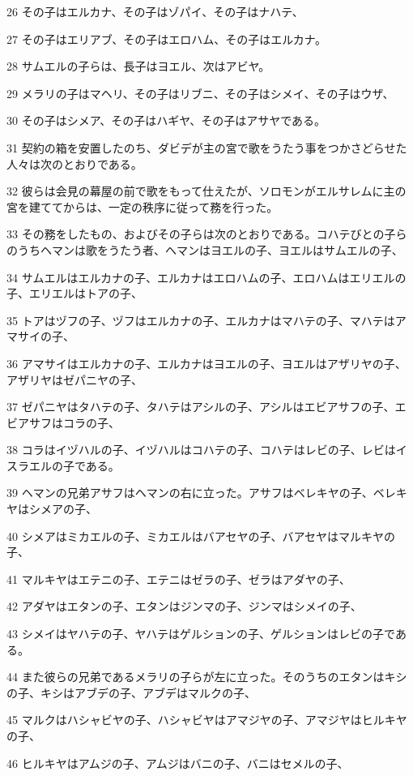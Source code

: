 \par 26 その子はエルカナ、その子はゾパイ、その子はナハテ、
\par 27 その子はエリアブ、その子はエロハム、その子はエルカナ。
\par 28 サムエルの子らは、長子はヨエル、次はアビヤ。
\par 29 メラリの子はマヘリ、その子はリブニ、その子はシメイ、その子はウザ、
\par 30 その子はシメア、その子はハギヤ、その子はアサヤである。
\par 31 契約の箱を安置したのち、ダビデが主の宮で歌をうたう事をつかさどらせた人々は次のとおりである。
\par 32 彼らは会見の幕屋の前で歌をもって仕えたが、ソロモンがエルサレムに主の宮を建ててからは、一定の秩序に従って務を行った。
\par 33 その務をしたもの、およびその子らは次のとおりである。コハテびとの子らのうちヘマンは歌をうたう者、ヘマンはヨエルの子、ヨエルはサムエルの子、
\par 34 サムエルはエルカナの子、エルカナはエロハムの子、エロハムはエリエルの子、エリエルはトアの子、
\par 35 トアはヅフの子、ヅフはエルカナの子、エルカナはマハテの子、マハテはアマサイの子、
\par 36 アマサイはエルカナの子、エルカナはヨエルの子、ヨエルはアザリヤの子、アザリヤはゼパニヤの子、
\par 37 ゼパニヤはタハテの子、タハテはアシルの子、アシルはエビアサフの子、エビアサフはコラの子、
\par 38 コラはイヅハルの子、イヅハルはコハテの子、コハテはレビの子、レビはイスラエルの子である。
\par 39 ヘマンの兄弟アサフはヘマンの右に立った。アサフはベレキヤの子、ベレキヤはシメアの子、
\par 40 シメアはミカエルの子、ミカエルはバアセヤの子、バアセヤはマルキヤの子、
\par 41 マルキヤはエテニの子、エテニはゼラの子、ゼラはアダヤの子、
\par 42 アダヤはエタンの子、エタンはジンマの子、ジンマはシメイの子、
\par 43 シメイはヤハテの子、ヤハテはゲルションの子、ゲルションはレビの子である。
\par 44 また彼らの兄弟であるメラリの子らが左に立った。そのうちのエタンはキシの子、キシはアブデの子、アブデはマルクの子、
\par 45 マルクはハシャビヤの子、ハシャビヤはアマジヤの子、アマジヤはヒルキヤの子、
\par 46 ヒルキヤはアムジの子、アムジはバニの子、バニはセメルの子、
